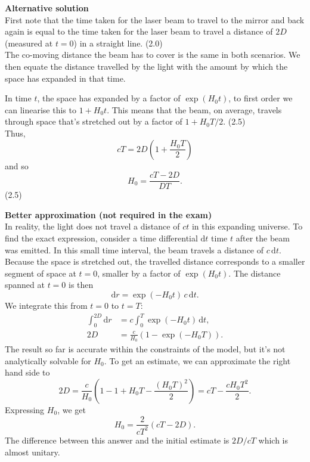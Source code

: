 \begin{description}
  \textbf{Alternative solution}\\
  First note that the time taken for the laser beam to travel to the mirror
  and back again is equal to the time taken for the laser beam to travel a
  distance of $2D$ (measured at $t = 0$) in a straight line. \hfill(2.0)\\
  The co-moving distance the beam has to cover is the same in both
  scenarios. We then equate the distance travelled by the light with the
  amount by which the space has expanded in that time.

  In time $t$, the space has expanded by a factor of $\exp(H_0 t)$, to
  first order we can linearise this to $1 + H_0 t$. This means that the
  beam, on average, travels through space that's stretched out by a factor
  of $1 + H_0 T/2$. \hfill(2.5)\\
  Thus,
  \[ cT = 2D\left(1 + \frac{H_0 T}{2}\right) \]
  and so
  \[ H_0 = \frac{cT - 2D}{DT}. \]
  \hfill(2.5)

  \textbf{Better approximation (not required in the exam)}\\
  In reality, the light does not travel a distance of $ct$ in this
  expanding universe. To find the exact expression, consider a time
  differential $\mathrm{d}t$ time $t$ after the beam was emitted. In this
  small time interval, the beam travels a distance of $c\,\mathrm{d}t$.
  Because the space is stretched out, the travelled distance corresponds to
  a smaller segment of space at $t = 0$, smaller by a factor of
  $\exp(H_0 t)$. The distance spanned at $t = 0$ is then
  \[ \mathrm{d}r = \exp(-H_0 t)\,c\,\mathrm{d}t. \]
  We integrate this from $t = 0$ to $t = T$:
  \begin{align*}
  \int_0^{2D}\mathrm{d}r &= c\int_0^{T}\exp(-H_0 t)\,\mathrm{d}t,\\
  2D &= \frac{c}{H_0}\left(1 - \exp(-H_0 T)\right).
  \end{align*}
  The result so far is accurate within the constraints of the model, but
  it's not analytically solvable for $H_0$. To get an estimate, we can
  approximate the right hand side to
  \[ 2D = \frac{c}{H_0}\left(1 - 1 + H_0 T - \frac{(H_0 T)^2}{2}\right)
     = cT - \frac{cH_0 T^2}{2}. \]
  Expressing $H_0$, we get
  \[ H_0 = \frac{2}{cT^2}\left(cT - 2D\right). \]
  The difference between this answer and the initial estimate is $2D/cT$
  which is almost unitary.


\end{description}
